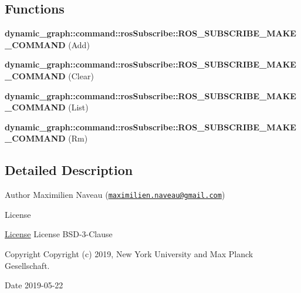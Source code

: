 \subsection*{Functions}
\begin{DoxyCompactItemize}
\item 
\mbox{\label{ros__subscribe_8hh_a851d0a5a8fb99787dac07721efad1749}} 
{\bfseries dynamic\+\_\+graph\+::command\+::ros\+Subscribe\+::\+R\+O\+S\+\_\+\+S\+U\+B\+S\+C\+R\+I\+B\+E\+\_\+\+M\+A\+K\+E\+\_\+\+C\+O\+M\+M\+A\+ND} (Add)
\item 
\mbox{\label{ros__subscribe_8hh_a9cd291bd1bf5d3ebbda624311439f01c}} 
{\bfseries dynamic\+\_\+graph\+::command\+::ros\+Subscribe\+::\+R\+O\+S\+\_\+\+S\+U\+B\+S\+C\+R\+I\+B\+E\+\_\+\+M\+A\+K\+E\+\_\+\+C\+O\+M\+M\+A\+ND} (Clear)
\item 
\mbox{\label{ros__subscribe_8hh_a9538860561adf4e2f36cbf232bd4cdab}} 
{\bfseries dynamic\+\_\+graph\+::command\+::ros\+Subscribe\+::\+R\+O\+S\+\_\+\+S\+U\+B\+S\+C\+R\+I\+B\+E\+\_\+\+M\+A\+K\+E\+\_\+\+C\+O\+M\+M\+A\+ND} (List)
\item 
\mbox{\label{ros__subscribe_8hh_af552c361a9ea2c6a0059a8f85b1d6842}} 
{\bfseries dynamic\+\_\+graph\+::command\+::ros\+Subscribe\+::\+R\+O\+S\+\_\+\+S\+U\+B\+S\+C\+R\+I\+B\+E\+\_\+\+M\+A\+K\+E\+\_\+\+C\+O\+M\+M\+A\+ND} (Rm)
\end{DoxyCompactItemize}


\subsection{Detailed Description}
\begin{DoxyAuthor}{Author}
Maximilien Naveau (\href{mailto:maximilien.naveau@gmail.com}{\tt maximilien.\+naveau@gmail.\+com}) 
\end{DoxyAuthor}
\begin{DoxyRefDesc}{License}
\item[\hyperlink{license__license000027}{License}]License B\+S\+D-\/3-\/\+Clause \end{DoxyRefDesc}
\begin{DoxyCopyright}{Copyright}
Copyright (c) 2019, New York University and Max Planck Gesellschaft. 
\end{DoxyCopyright}
\begin{DoxyDate}{Date}
2019-\/05-\/22 
\end{DoxyDate}


